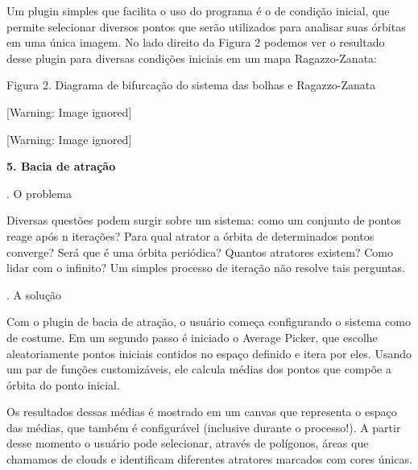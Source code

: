 \documentclass[a4paper,12pt]{article}
\begin{document}
{
 Um plugin simples que facilita o uso do programa \'e o de
condi\c{c}\~ao inicial, que permite selecionar diversos pontos que
ser\~ao utilizados para analisar suas \'orbitas em uma \'unica imagem.
No lado direito da Figura 2 podemos ver o resultado desse plugin para
diversas condi\c{c}\~oes iniciais em um mapa Ragazzo{}-Zanata:}

{\centering{}\mdseries
Figura 2. Diagrama de bifurca\c{c}\~ao do sistema das bolhas e
Ragazzo{}-Zanata
\par}

\begin{center}
 [Warning: Image ignored] %

\end{center}
\begin{center}
 [Warning: Image ignored] %

\end{center}
{\bfseries
5. Bacia de atra\c{c}\~ao}

{. O problema}

{
Diversas quest\~oes podem surgir sobre um sistema: como um conjunto de
pontos reage ap\'os n itera\c{c}\~oes? Para qual atrator a \'orbita de
determinados pontos converge? Ser\'a que \'e uma \'orbita peri\'odica?
Quantos atratores existem? Como lidar com o infinito? Um simples
processo de itera\c{c}\~ao n\~ao resolve tais perguntas.}

{. A solu\c{c}\~ao}

{
 Com o plugin de bacia de atra\c{c}\~ao, o usu\'ario come\c{c}a
configurando o sistema como de costume. Em um segundo passo \'e
iniciado o Average Picker, que escolhe aleatoriamente pontos iniciais
contidos no espa\c{c}o definido e itera por eles. Usando um par de
fun\c{c}\~oes customiz\'aveis, ele calcula m\'edias dos pontos que
comp\~oe a \'orbita do ponto inicial.}

{
 Os resultados dessas m\'edias \'e mostrado em um canvas que representa
o espa\c{c}o das m\'edias, que tamb\'em \'e configur\'avel (inclusive
durante o processo!). A partir desse momento o usu\'ario pode
selecionar, atrav\'es de pol\'igonos, \'areas que chamamos de clouds e
identificam diferentes atratores marcados com cores \'unicas.}
\end{document}

